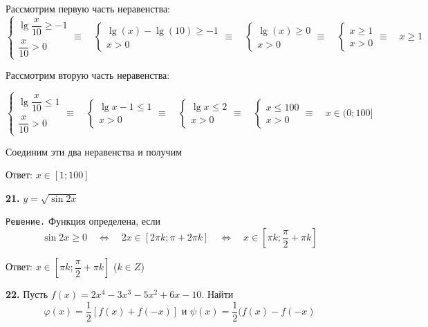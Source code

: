 \documentclass[12pt]{article}
\begin{document}
Рассмотрим первую часть неравенства:
\begin{equation*}
\begin{cases}
	\lg\dfrac{x}{10}\ge -1\\
	\dfrac{x}{10}>0
\end{cases} \equiv\quad 
\begin{cases}
	\lg(x)-\lg(10)\ge -1\\
	x>0
\end{cases}\equiv\quad 
\begin{cases}
	\lg(x)\ge0 \\x>0
\end{cases}\equiv\quad
\begin{cases}
	x\ge 1\\
	x>0
\end{cases} \equiv\quad x\ge1
\end{equation*}

Рассмотрим вторую часть неравенства:

\begin{equation*}
\begin{cases}
	\lg\dfrac{x}{10}\le 1\\
	\dfrac{x}{10} >0
\end{cases}\equiv\quad 
\begin{cases}
	\lg x - 1\le 1 \\x>0
\end{cases}\equiv \quad 
\begin{cases}
	\lg x\le 2 \\
	x>0
\end{cases}\equiv\quad
\begin{cases}
	x\le 100\\
	x>0
\end{cases} \equiv\quad x\in (0;100]
\end{equation*}

	Соединим эти два неравенства и получим
	
	Ответ: $x\in [1;100]$
	\vspace{2mm}
	
{\bf 21.} $y =\sqrt{\sin 2x}$

{\tt Решение.} Функция определена, если 
\[
	\sin 2x \ge 0\quad\Leftrightarrow\quad 2x \in [2\pi k; \pi+2\pi k]\quad\Leftrightarrow\quad x\in [\pi k; \dfrac{\pi}{2}+\pi k]
\]
	
	Ответ: $x\in [\pi k; \dfrac{\pi}{2}+\pi k]$ ($k\in Z$)
	
{\bf 22.} Пусть $f(x) =2x^4-3x^3-5x^2+6x-10$. Найти
\[
	\varphi(x) = \dfrac{1}{2}[f(x)+f(-x)] \text{ и } \psi(x) = \dfrac{1}{2}(f(x)-f(-x)
\]
	
\end{document}
